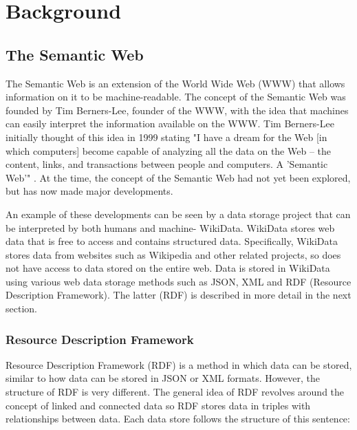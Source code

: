 \usetikzlibrary {arrows}
\usetikzlibrary {shapes.geometric}
\usetikzlibrary {patterns}

\chapter{Background}

\section{The Semantic Web}
\hspace*{0.5cm} The Semantic Web is an extension of the World Wide Web (WWW) that allows information on it to be machine-readable. The concept of the Semantic Web was founded by  Tim Berners-Lee, founder of the WWW, with the idea that machines can easily interpret the information available on the WWW. Tim Berners-Lee initially thought of this idea in 1999 stating "I have a dream for the Web [in which computers] become capable of analyzing all the data on the Web – the content, links, and transactions between people and computers. A 'Semantic Web'" \cite{TBLBook}. At the time, the concept of the Semantic Web had not yet been explored, but has now made major developments. \cite{semanticweb}

An example of these developments can be seen by a data storage project that can be interpreted by both humans and machine- WikiData. WikiData stores web data that is free to access and contains structured data. Specifically, WikiData stores data from websites such as Wikipedia and other related projects, so does not have access to data stored on the entire web. \cite{wikidata} Data is stored in WikiData using various web data storage methods such as JSON, XML and RDF (Resource Description Framework). The latter (RDF) is described in more detail in the next section.  

\subsection{Resource Description Framework}
\hspace*{0.5cm} Resource Description Framework (RDF) is a method in which data can be stored, similar to how data can be stored in JSON or XML formats. However, the structure of RDF is very different. The general idea of RDF revolves around the concept of linked and connected data so RDF stores data in triples with relationships between data. \cite{rdf} Each data store follows the structure of this sentence: 

